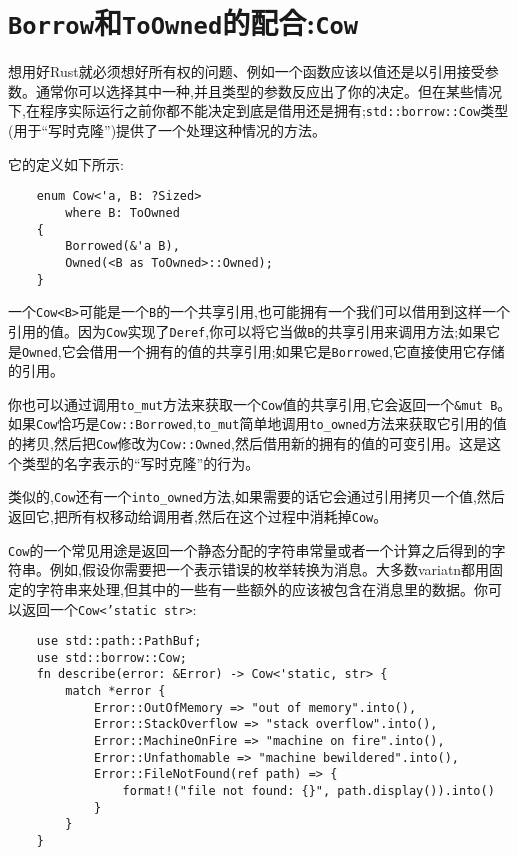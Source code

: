 \section{\texttt{Borrow}和\texttt{ToOwned}的配合:\texttt{Cow}}\label{Cow}

想用好Rust就必须想好所有权的问题、例如一个函数应该以值还是以引用接受参数。通常你可以选择其中一种,并且类型的参数反应出了你的决定。但在某些情况下,在程序实际运行之前你都不能决定到底是借用还是拥有;\texttt{std::borrow::Cow}类型(用于“写时克隆”)提供了一个处理这种情况的方法。

它的定义如下所示:
\begin{verbatim}
    enum Cow<'a, B: ?Sized>
        where B: ToOwned
    {
        Borrowed(&'a B),
        Owned(<B as ToOwned>::Owned);
    }
\end{verbatim}

一个\texttt{Cow<B>}可能是一个\texttt{B}的一个共享引用,也可能拥有一个我们可以借用到这样一个引用的值。因为\texttt{Cow}实现了\texttt{Deref},你可以将它当做\texttt{B}的共享引用来调用方法;如果它是\texttt{Owned},它会借用一个拥有的值的共享引用;如果它是\texttt{Borrowed},它直接使用它存储的引用。

你也可以通过调用\texttt{to\_mut}方法来获取一个\texttt{Cow}值的共享引用,它会返回一个\texttt{\&mut B}。如果\texttt{Cow}恰巧是\texttt{Cow::Borrowed},\texttt{to\_mut}简单地调用\texttt{to\_owned}方法来获取它引用的值的拷贝,然后把\texttt{Cow}修改为\texttt{Cow::Owned},然后借用新的拥有的值的可变引用。这是这个类型的名字表示的“写时克隆”的行为。

类似的,\texttt{Cow}还有一个\texttt{into\_owned}方法,如果需要的话它会通过引用拷贝一个值,然后返回它,把所有权移动给调用者,然后在这个过程中消耗掉\texttt{Cow}。


\texttt{Cow}的一个常见用途是返回一个静态分配的字符串常量或者一个计算之后得到的字符串。例如,假设你需要把一个表示错误的枚举转换为消息。大多数variatn都用固定的字符串来处理,但其中的一些有一些额外的应该被包含在消息里的数据。你可以返回一个\texttt{Cow<'static str>}:
\begin{verbatim}
    use std::path::PathBuf;
    use std::borrow::Cow;
    fn describe(error: &Error) -> Cow<'static, str> {
        match *error {
            Error::OutOfMemory => "out of memory".into(),
            Error::StackOverflow => "stack overflow".into(),
            Error::MachineOnFire => "machine on fire".into(),
            Error::Unfathomable => "machine bewildered".into(),
            Error::FileNotFound(ref path) => {
                format!("file not found: {}", path.display()).into()
            }
        }
    }
\end{verbatim}


